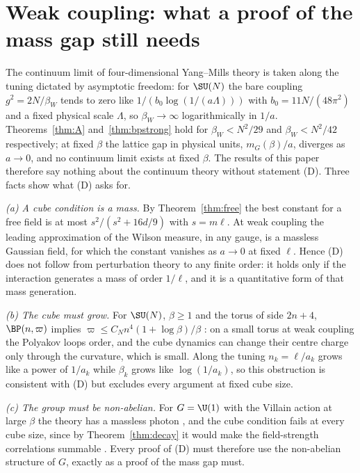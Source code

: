 
\section{Weak coupling: what a proof of the mass gap still needs}\label{sec:weak}

The continuum limit of four-dimensional Yang--Mills theory is taken along the
tuning dictated by asymptotic freedom: for $\SU(N)$ the bare coupling
$g^2=2N/\beta_W$ tends to zero like $1/(b_0\log(1/(a\Lambda)))$ with
$b_0=11N/(48\pi^2)$ and a fixed physical scale $\Lambda$, so $\beta_W\to\infty$
logarithmically in $1/a$. Theorems~\ref{thm:A} and~\ref{thm:bpstrong} hold for
$\beta_W<N^2/29$ and $\beta_W<N^2/42$ respectively; at fixed $\beta$ the lattice
gap in physical units, $m_G(\beta)/a$, diverges as $a\to0$, and no continuum
limit exists at fixed $\beta$. The results of this paper therefore say nothing
about the continuum theory without statement (D). Three facts show what (D)
asks for.

\emph{(a) A cube condition is a mass.} By Theorem~\ref{thm:free} the best
constant for a free field is at most $s^2/(s^2+16d/9)$ with $s=m\ell$. At weak
coupling the leading approximation of the Wilson measure, in any gauge, is a
massless Gaussian field, for which the constant vanishes as $a\to0$ at fixed
$\ell$. Hence (D) does not follow from perturbation theory to any finite order:
it holds only if the interaction generates a mass of order $1/\ell$, and it is
a quantitative form of that mass generation.

\emph{(b) The cube must grow.} For $\SU(N)$, $\beta\ge1$ and the torus of side
$2n+4$, $\BP(n,\varpi)$ implies $\varpi\le C_Nn^4(1+\log\beta)/\beta$
\cite{BBLRS26}: on a small torus at weak coupling the Polyakov loops order, and
the cube dynamics can change their centre charge only through the curvature,
which is small. Along the tuning $n_k=\ell/a_k$ grows like a power of $1/a_k$
while $\beta_k$ grows like $\log(1/a_k)$, so this obstruction is consistent with
(D) but excludes every argument at fixed cube size.

\emph{(c) The group must be non-abelian.} For $G=\U(1)$ with the Villain
action at large $\beta$ the theory has a massless photon \cite{FS82}, and the
cube condition fails at every cube size, since by Theorem~\ref{thm:decay} it
would make the field-strength correlations summable \cite{BBLRS26}. Every proof
of (D) must therefore use the non-abelian structure of $G$, exactly as a proof
of the mass gap must.

